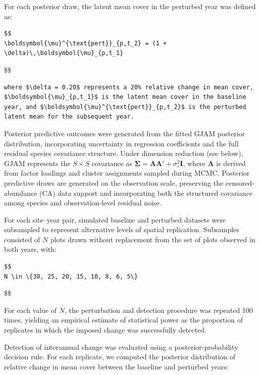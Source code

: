 \documentclass[
  11pt,
]{article}
\begin{document}
For each posterior draw, the latent mean cover in the perturbed year was
defined as:

\begin{verbatim}
$$
\boldsymbol{\mu}^{\text{pert}}_{p,t_2} = (1 + \delta)\,\boldsymbol{\mu}_{p,t_1}
\end{verbatim}

\$\$

\begin{verbatim}
where $\delta = 0.20$ represents a 20% relative change in mean cover, $\boldsymbol{\mu}_{p,t_1}$ is the latent mean cover in the baseline year, and $\boldsymbol{\mu}^{\text{pert}}_{p,t_2}$ is the perturbed latent mean for the subsequent year.
\end{verbatim}

Posterior predictive outcomes were generated from the fitted GJAM
posterior distribution, incorporating uncertainty in regression
coefficients and the full residual species covariance structure. Under
dimension reduction (see below), GJAM represents the \(S \times S\)
covariance as
\(\boldsymbol{\Sigma} = \mathbf{A}\mathbf{A}' + \sigma^2_\varepsilon \mathbf{I}\),
where \(\mathbf{A}\) is derived from factor loadings and cluster
assignments sampled during MCMC. Posterior predictive draws are
generated on the observation scale, preserving the censored-abundance
(CA) data support and incorporating both the structured covariance among
species and observation-level residual noise.

For each site--year pair, simulated baseline and perturbed datasets were
subsampled to represent alternative levels of spatial replication.
Subsamples consisted of \(N\) plots drawn without replacement from the
set of plots observed in both years, with:

\begin{verbatim}
$$
N \in \{30, 25, 20, 15, 10, 8, 6, 5\}
\end{verbatim}

\$\$

For each value of \(N\), the perturbation and detection procedure was
repeated 100 times, yielding an empirical estimate of statistical power
as the proportion of replicates in which the imposed change was
successfully detected.

Detection of interannual change was evaluated using a
posterior-probability decision rule. For each replicate, we computed the
posterior distribution of relative change in mean cover between the
baseline and perturbed years:
\end{document}
